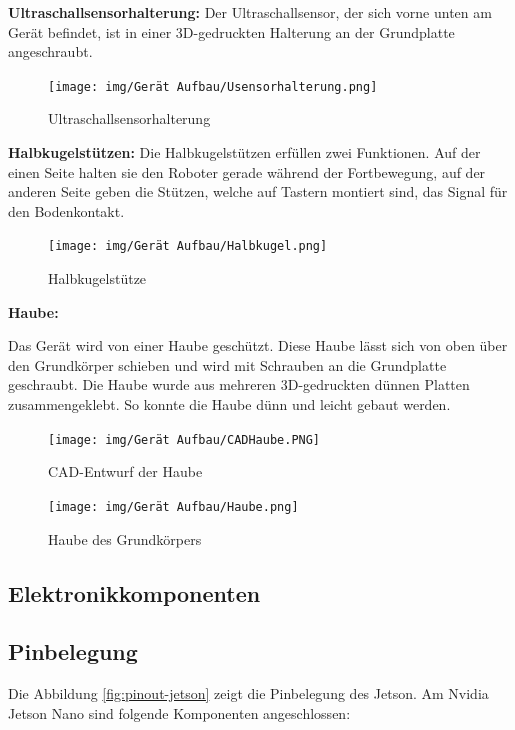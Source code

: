 \textbf{Ultraschallsensorhalterung:} Der Ultraschallsensor, der sich vorne unten am Gerät befindet, ist in einer 3D-gedruckten Halterung an der Grundplatte angeschraubt.

\begin{figure}[H]
  \texttt{[image: img/Gerät Aufbau/Usensorhalterung.png]}
  \centering
  \caption{Ultraschallsensorhalterung}
  \label{fig:Uschallsensorhalterung}
\end{figure}

\textbf{Halbkugelstützen:} Die Halbkugelstützen erfüllen zwei Funktionen. Auf der einen Seite halten sie den Roboter gerade während der Fortbewegung, auf der anderen Seite geben die Stützen, welche auf Tastern montiert sind, das Signal für den Bodenkontakt.

\begin{figure}[H]
  \texttt{[image: img/Gerät Aufbau/Halbkugel.png]}
  \centering
  \caption{Halbkugelstütze}
  \label{fig:Halbkugelstütze}
\end{figure}

\newpage

\textbf{Haube:}

Das Gerät wird von einer Haube geschützt. Diese Haube lässt sich von oben über den Grundkörper schieben und wird mit Schrauben an die Grundplatte geschraubt. Die Haube wurde aus mehreren 3D-gedruckten dünnen Platten zusammengeklebt. So konnte die Haube dünn und leicht gebaut werden.

\begin{figure}[H]
  \texttt{[image: img/Gerät Aufbau/CADHaube.PNG]}
  \centering
  \caption{CAD-Entwurf der Haube}
  \label{fig:Haube}
\end{figure}

\begin{figure}[H]
  \texttt{[image: img/Gerät Aufbau/Haube.png]}
  \centering
  \caption{Haube des Grundkörpers}
  \label{fig:Haube1}
\end{figure}






\newpage

\subsection{Elektronikkomponenten}
\subsection{Pinbelegung}
Die Abbildung \ref{fig:pinout-jetson} zeigt die Pinbelegung des Jetson. Am Nvidia Jetson Nano sind folgende Komponenten angeschlossen:

